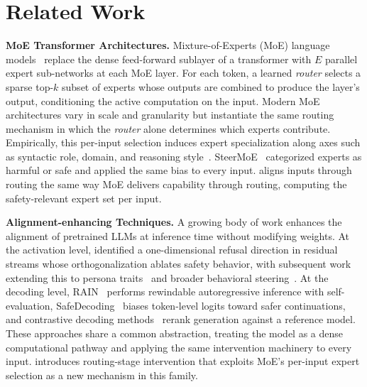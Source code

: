 \section{Related Work}
\label{sec:related}

\noindent\textbf{MoE Transformer Architectures.}
Mixture-of-Experts (MoE) language models~\cite{shazeer2017outrageously, fedus2022switch, zoph2022stmoe} replace the dense feed-forward sublayer of a transformer with $E$ parallel expert sub-networks at each MoE layer. For each token, a learned \textit{router} selects a sparse top-$k$ subset of experts whose outputs are combined to produce the layer's output, conditioning the active computation on the input. Modern MoE architectures vary in scale and granularity but instantiate the same routing mechanism in which the \textit{router} alone determines which experts contribute. Empirically, this per-input selection induces expert specialization along axes such as syntactic role, domain, and reasoning style~\cite{riquelme2021scaling}. SteerMoE~\cite{fayyaz2025steermoe} categorized experts as harmful or safe and applied the same bias to every input. \name{} aligns inputs through routing the same way MoE delivers capability through routing, computing the safety-relevant expert set per input.


\noindent\textbf{Alignment-enhancing Techniques.}
A growing body of work enhances the alignment of pretrained LLMs at inference time without modifying weights. At the activation level, \citet{arditi2024refusal} identified a one-dimensional refusal direction in residual streams whose orthogonalization ablates safety behavior, with subsequent work extending this to persona traits~\cite{chen2025persona} and broader behavioral steering~\cite{subramani2022extracting, turner2023activation, rimsky2024caa, marks2023geometry}. At the decoding level, RAIN~\cite{li2024rain} performs rewindable autoregressive inference with self-evaluation, SafeDecoding~\cite{xu2024safedecoding} biases token-level logits toward safer continuations, and contrastive decoding methods~\cite{li2023contrastive, obrien2023contrastive} rerank generation against a reference model. These approaches share a common abstraction, treating the model as a dense computational pathway and applying the same intervention machinery to every input. \name{} introduces routing-stage intervention that exploits MoE's per-input expert selection as a new mechanism in this family.

